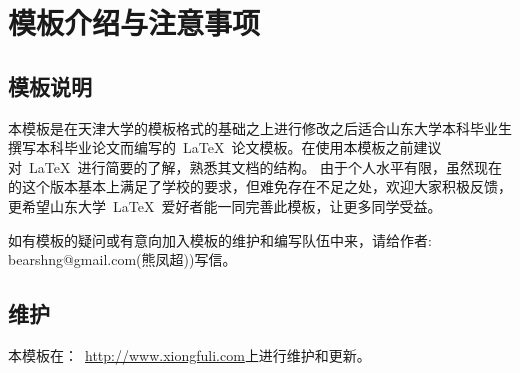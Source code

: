 
\chapter{模板介绍与注意事项}

\section{模板说明}

本模板是在天津大学的模板格式的基础之上进行修改之后适合山东大学本科毕业生撰写本科毕业论文而编写的~\LaTeX~论文模板。在使用本模板之前建议对~\LaTeX~进行简要的了解，熟悉其文档的结构。
由于个人水平有限，虽然现在的这个版本基本上满足了学校的要求，但难免存在不足之处，欢迎大家积极反馈，更希望山东大学~\LaTeX~爱好者能一同完善此模板，让更多同学受益。

如有模板的疑问或有意向加入模板的维护和编写队伍中来，请给作者: bearshng@gmail.com(熊凤超))写信。

\section{维护}
本模板在：~\url{http://www.xiongfuli.com}上进行维护和更新。


